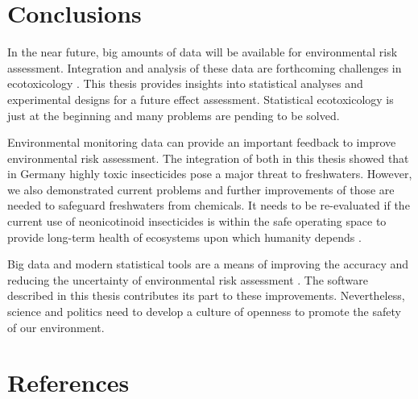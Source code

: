 \clearpage
\section{Conclusions}
In the near future, big amounts of data will be available for environmental risk assessment.
Integration and analysis of these data are forthcoming challenges in  ecotoxicology \citep{dafforn_big_2015, van_den_brink_new_2016}. 
This thesis provides insights into statistical analyses and experimental designs for a future effect assessment. Statistical ecotoxicology is just at the beginning and many problems are pending to be solved. 

Environmental monitoring data can provide an important feedback to improve environmental risk assessment. 
The integration of both in this thesis showed that in Germany highly toxic insecticides pose a major threat to freshwaters.
However, we also demonstrated current problems and further improvements of those are needed to safeguard freshwaters from chemicals.
It needs to be re-evaluated if the current use of neonicotinoid insecticides is within the safe operating space to provide long-term health of ecosystems upon which humanity depends \citep{rockstrom_safe_2009}. 

Big data and modern statistical tools are a means of improving the accuracy and reducing the uncertainty of environmental risk assessment \citep{van_den_brink_new_2016}. 
The software described in this thesis contributes its part to these improvements.
Nevertheless, science and politics need to develop a culture of openness to promote the safety of our environment. 



\clearpage
\section{References}
\printbibliography[heading=none]
